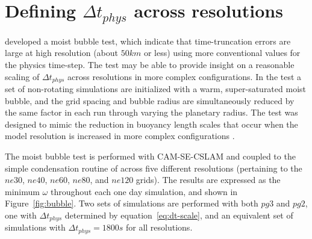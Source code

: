 \documentclass{agujournal}
\begin{document}



%
%
%
%
\appendix
\section{Defining $\Delta t_{phys}$ across resolutions}\label{sec:app1}
 \cite{HR2018JAMES} developed a moist bubble test, which indicate that time-truncation errors are large at high resolution (about $50km$ or less) using more conventional values for the physics time-step. The test may be able to provide insight on a reasonable scaling of $\Delta t_{phys}$ across resolutions in more complex configurations. In the test a set of non-rotating simulations are initialized with a warm, super-saturated moist bubble, and the grid spacing and bubble radius are simultaneously reduced by the same factor in each run through varying the planetary radius. The test was designed to mimic the reduction in buoyancy length scales that occur when the model resolution is increased in more complex configurations \citep{HETAL2006JCLIM,HR2018JAMES}. 
 
The moist bubble test is performed with CAM-SE-CSLAM and coupled to the simple condensation routine of \cite{K1969MM} across five different resolutions (pertaining to the $ne30$, $ne40$, $ne60$, $ne80$, and $ne120$ grids). The results are expressed as the minimum $\omega$ throughout each one day simulation, and shown in Figure~\ref{fig:bubble}. Two sets of simulations are performed with both $pg3$ and $pg2$, one with $\Delta t_{phys}$ determined by equation~\eqref{eq:dt-scale}, and an equivalent set of simulations with $\Delta t_{phys} = 1800s$ for all resolutions. 
\end{document}

